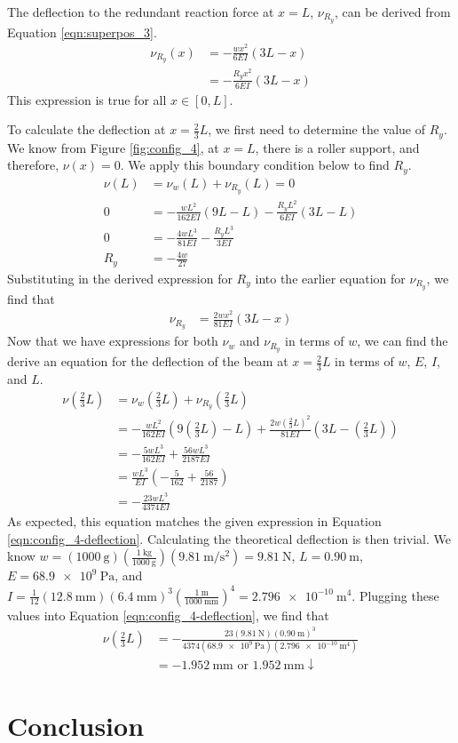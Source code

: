 \documentclass[12 pt]{article}
\begin{document}
The deflection to the redundant reaction force at $x=L$, $\nu_{R_y}$, can be derived from Equation \ref{eqn:superpos_3}.
\begin{align*}
	\nu_{R_y}(x)&=-\frac{wx^2}{6EI}(3L-x)\\
	&=-\frac{R_yx^2}{6EI}(3L-x)
\end{align*}
This expression is true for all $x\in[0,L]$.

To calculate the deflection at $x=\frac{2}{3}L$, we first need to determine the value of $R_y$. We know from Figure \ref{fig:config_4}, at $x=L$, there is a roller support, and therefore, $\nu(x)=0$. We apply this boundary condition below to find $R_y$.
\begin{align*}
	\nu(L)&=\nu_w(L)+\nu_{R_y}(L)=0\\
	0&=-\frac{wL^2}{162EI}(9L-L)-\frac{R_yL^2}{6EI}(3L-L)\\
	0&=-\frac{4wL^3}{81EI}-\frac{R_yL^3}{3EI}\\
	R_y&=-\frac{4w}{27}
\end{align*}
Substituting in the derived expression for $R_y$ into the earlier equation for $\nu_{R_y}$, we find that
\begin{align*}
	\nu_{R_y}&=\frac{2wx^2}{81EI}(3L-x)
\end{align*}
Now that we have expressions for both $\nu_w$ and $\nu_{R_y}$ in terms of $w$, we can find the derive an equation for the deflection of the beam at $x=\frac{2}{3}L$ in terms of $w$, $E$, $I$, and $L$.
\begin{align*}
	\nu\left(\frac{2}{3}L\right)&=\nu_w\left(\frac{2}{3}L\right)+\nu_{R_y}\left(\frac{2}{3}L\right)\\
	&=-\frac{wL^2}{162EI}\left(9\left(\frac{2}{3}L\right)-L\right)+\frac{2w\left(\frac{2}{3}L\right)^2}{81EI}\left(3L-\left(\frac{2}{3}L\right)\right)\\
	&=-\frac{5wL^3}{162EI}+\frac{56wL^3}{2187EI}\\
	&=\frac{wL^3}{EI}\left(-\frac{5}{162}+\frac{56}{2187}\right)\\
	&=-\frac{23wL^3}{4374EI}
\end{align*}
As expected, this equation matches the given expression in Equation \ref{eqn:config_4-deflection}. Calculating the theoretical deflection is then trivial. We know $w=(\qty{1000}{\g})(\frac{\qty{1}{\kg}}{\qty{1000}{\g}})(\qty[per-mode = fraction]{9.81}{\m\per\s\squared})=\qty{9.81}{\N}$, $L=\qty{0.90}{\m}$, $E=\qty{68.9e9}{\Pa}$, and $I=\frac{1}{12}(\qty{12.8}{\mm})(\qty{6.4}{\mm})^3(\frac{\qty{1}{\m}}{\qty{1000}{\mm}})^4=\qty{2.796e-10}{\m^4}$. Plugging these values into Equation \ref{eqn:config_4-deflection}, we find that
\begin{align*}
	\nu\left(\frac{2}{3}L\right)&=-\frac{23(\qty{9.81}{\N})(\qty{0.90}{\m})^3}{4374(\qty{68.9e9}{\Pa})(\qty{2.796e-10}{\m^4})}\\
	&=\qty{-1.952}{\mm}\text{ or }\qty{1.952}{\mm}\downarrow
\end{align*}

\section{Conclusion} \label{conclusion}
\end{document}
